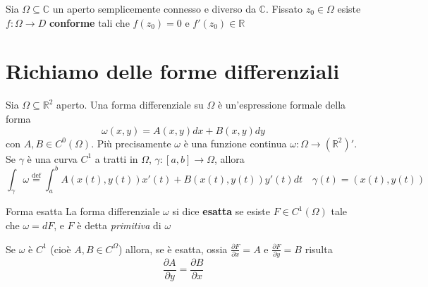 \begin{theorem}
    Sia \(\Omega \subseteq \mathbb{C} \) un aperto semplicemente connesso e
    diverso da \(\mathbb{C}\). Fissato \(z_{0} \in\Omega\) esiste \(f : \Omega
    \to D\) \textbf{conforme} tali che \(f{(z_{0})} = 0\) e \(f'{(z_{0})} \in \mathbb{R}\)
\end{theorem}

\newpage
\section{Richiamo delle forme differenziali}

Sia \(\Omega \subseteq \mathbb{R}^{2} \) aperto. Una forma differenziale su \(\Omega\) è
un'espressione formale della forma 
\[
    \omega(x, y) = A(x,y)dx + B(x,y) dy
\]
con \(A, B \in C^{0}(\Omega)\). Più precisamente \(\omega\) è una funzione
continua \(\omega: \Omega \to (\mathbb{R}^{2})'\). Se \(\gamma\) è una curva
\(C^{1}\) a tratti in \(\Omega\), \(\gamma : [a,b] \to \Omega\), allora
\[
    \int_{\gamma}\omega \overset{\text{def}}{=} \int_{a}^{b} A{(x(t), y(t))}
    x'{(t)} + B{(x(t), y(t))} y'{(t)} dt \quad \gamma{(t)} = (x(t), y(t))
\]
\begin{definition}{Forma esatta}
    La forma differenziale \(\omega\) si dice \textbf{esatta} se esiste \(F \in
    C^{1}(\Omega)\) tale che \(\omega = dF\), e \(F\) è detta \emph{primitiva}
    di \(\omega\) 
\end{definition}

Se \(\omega\) è \(C^{1}\) (cioè \(A, B \in C^{\Omega}\)) allora, se è esatta,
ossia \(\frac{\partial F}{\partial x} = A\) e \(\frac{\partial F}{\partial y} =
B\) risulta
\begin{equation}\label{eq:forma-chiusa}
    \frac{\partial A}{\partial y} = \frac{\partial B}{\partial x}
\end{equation}

